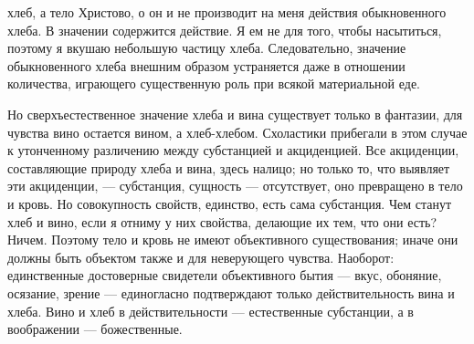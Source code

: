 \documentclass[12pt,oneside]{book}
\begin{document}
хлеб, а тело Христово, о он и не производит на меня действия обыкновенного хлеба. В значении содержится действие. Я ем не для того, чтобы насытиться, поэтому я вкушаю небольшую частицу хлеба. Следовательно, значение обыкновенного хлеба внешним образом устраняется даже в отношении количества, играющего существенную роль при всякой материальной еде.



Но сверхъестественное значение хлеба и вина существует только в фантазии, для чувства вино остается вином, а хлеб-хлебом. Схоластики прибегали в этом случае к утонченному различению между субстанцией и акциденцией. Все акциденции, составляющие природу хлеба и вина, здесь налицо; но только то, что выявляет эти акциденции, --- субстанция, сущность --- отсутствует, оно превращено в тело и кровь. Но совокупность свойств, единство, есть сама субстанция. Чем станут хлеб и вино, если я отниму у них свойства, делающие их тем, что они есть? Ничем. Поэтому тело и кровь не имеют объективного существования; иначе они должны быть объектом также и для неверующего чувства. Наоборот: единственные достоверные свидетели объективного бытия --- вкус, обоняние, осязание, зрение --- единогласно подтверждают только действительность вина и хлеба. Вино и хлеб в действительности --- естественные субстанции, а в воображении --- божественные.
\end{document}
